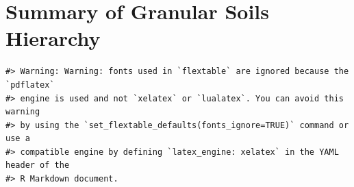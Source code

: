 \documentclass[
  letterpaper,
  DIV=11,
  numbers=noendperiod]{scrreprt}
\begin{document}
\hypertarget{sec-sum-N}{%
\section{Summary of Granular Soils Hierarchy}\label{sec-sum-N}}

\begin{verbatim}
#> Warning: Warning: fonts used in `flextable` are ignored because the `pdflatex`
#> engine is used and not `xelatex` or `lualatex`. You can avoid this warning
#> by using the `set_flextable_defaults(fonts_ignore=TRUE)` command or use a
#> compatible engine by defining `latex_engine: xelatex` in the YAML header of the
#> R Markdown document.
\end{verbatim}

\providecommand{\docline}[3]{\noalign{\global\setlength{\arrayrulewidth}{#1}}\arrayrulecolor[HTML]{#2}\cline{#3}}

\setlength{\tabcolsep}{2pt}

\renewcommand*{\arraystretch}{1.5}
\end{document}

